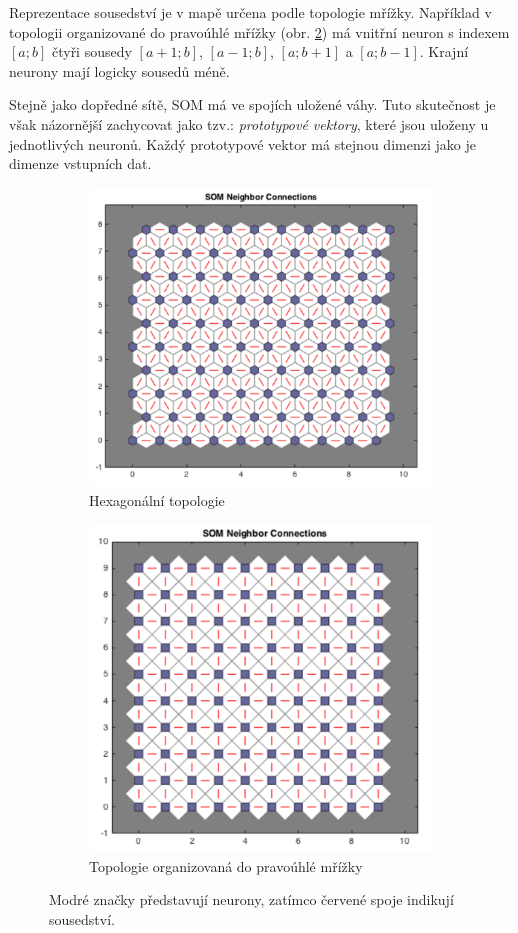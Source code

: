 \documentclass[thesis=M,czech]{FITthesis}[2012/06/26]
\begin{document}
Reprezentace sousedství je v mapě určena podle topologie mřížky. Například v topologii organizované do pravoúhlé mřížky (obr. \ref{fig:mesh}) má vnitřní neuron s indexem $[a;b]$ čtyři sousedy $[a+1;b]$, $[a-1;b]$, $[a;b+1]$ a $[a;b-1]$. Krajní neurony mají logicky sousedů méně.

Stejně jako dopředné sítě, SOM má ve spojích uložené váhy. Tuto skutečnost je však názornější zachycovat jako tzv.: \textit{prototypové vektory}, které jsou uloženy u jednotlivých neuronů. Každý prototypové vektor  má stejnou dimenzi jako je dimenze vstupních dat.

\begin{figure}
\centering
\begin{subfigure}{.5\textwidth}
  \centering
  \includegraphics[width=.8\linewidth]{hex_top}
  \caption{Hexagonální topologie}
  \label{fig:hextop}
\end{subfigure}%
\begin{subfigure}{.5\textwidth}
  \centering
  \includegraphics[width=.73\linewidth]{grid_top}
  \caption{Topologie organizovaná do pravoúhlé mřížky}
  \label{fig:mesh}
\end{subfigure}
\caption{Modré značky představují neurony, zatímco červené spoje indikují sousedství.}
\label{fig:topology}
\end{figure}
\end{document}
